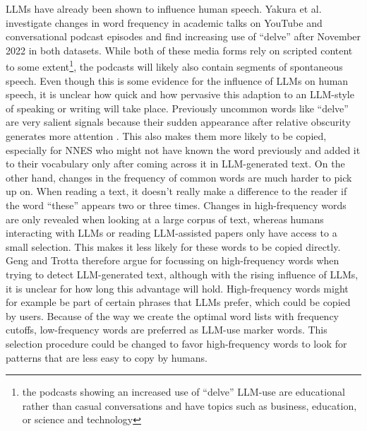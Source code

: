LLMs have already been shown to influence human speech.
Yakura et al. \cite{Yakura2025} investigate changes in word frequency in academic talks on YouTube and conversational podcast episodes and find increasing use of ``delve'' after November 2022 in both datasets.
While both of these media forms rely on scripted content to some extent\footnote{the podcasts showing an increased use of ``delve'' LLM-use are educational rather than casual conversations and have topics such as business, education, or science and technology}, the podcasts will likely also contain segments of spontaneous speech. 
Even though this is some evidence for the influence of LLMs on human speech, it is unclear how quick and how pervasive this adaption to an LLM-style of speaking or writing will take place.
Previously uncommon words like ``delve'' are very salient signals because their sudden appearance after relative obscurity generates more attention \cite{Geng2025}.
This also makes them more likely to be copied, especially for NNES who might not have known the word previously and added it to their vocabulary only after coming across it in LLM-generated text.
On the other hand, changes in the frequency of common words are much harder to pick up on.
When reading a text, it doesn't really make a difference to the reader if the word ``these'' appears two or three times.
Changes in high-frequency words are only revealed when looking at a large corpus of text, whereas humans interacting with LLMs or reading LLM-assisted papers only have access to a small selection.
This makes it less likely for these words to be copied directly.
Geng and Trotta \cite{Geng2025} therefore argue for focussing on high-frequency words when trying to detect LLM-generated text, although with the rising influence of LLMs, it is unclear for how long this advantage will hold.
High-frequency words might for example be part of certain phrases that LLMs prefer, which could be copied by users.
Because of the way we create the optimal word lists with frequency cutoffs, low-frequency words are preferred as LLM-use marker words. 
This selection procedure could be changed to favor high-frequency words to look for patterns that are less easy to copy by humans.

